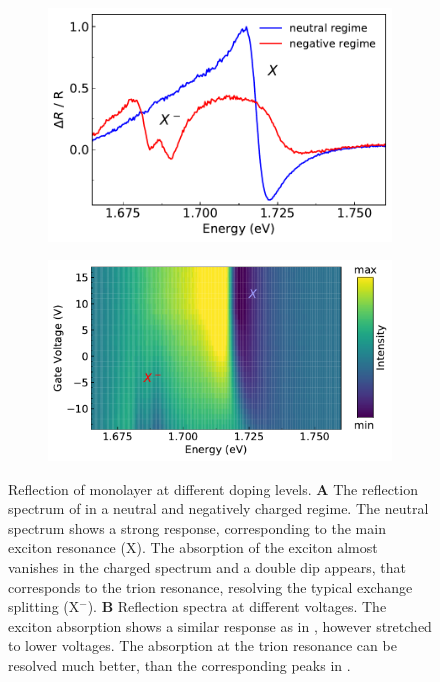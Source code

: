 \begin{figure}[t]
	\begin{subfigure}{0.49\textwidth}
		\caption{}
		\includegraphics[height=0.65\textwidth]{RF_neut_neg_pure}
	\end{subfigure}
	\begin{subfigure}{0.49\textwidth}
		\caption{}
		\includegraphics[height=0.65\textwidth]{RF_Voltsweep}
	\end{subfigure}

	\caption{Reflection of monolayer \wse at different doping levels. \textbf{A} The reflection spectrum of \wse in a neutral and negatively charged regime. The neutral spectrum shows a strong response, corresponding to the main exciton resonance (X). The absorption of the exciton almost vanishes in the charged spectrum and a double dip appears, that corresponds to the trion resonance, resolving the typical exchange splitting (X$^-$). \textbf{B} Reflection spectra at different voltages. The exciton absorption shows a similar response as in \pl, however stretched to lower voltages. The absorption at the trion resonance can be resolved much better, than the corresponding peaks in \pl. }\label{rfspectrum}
\end{figure}

